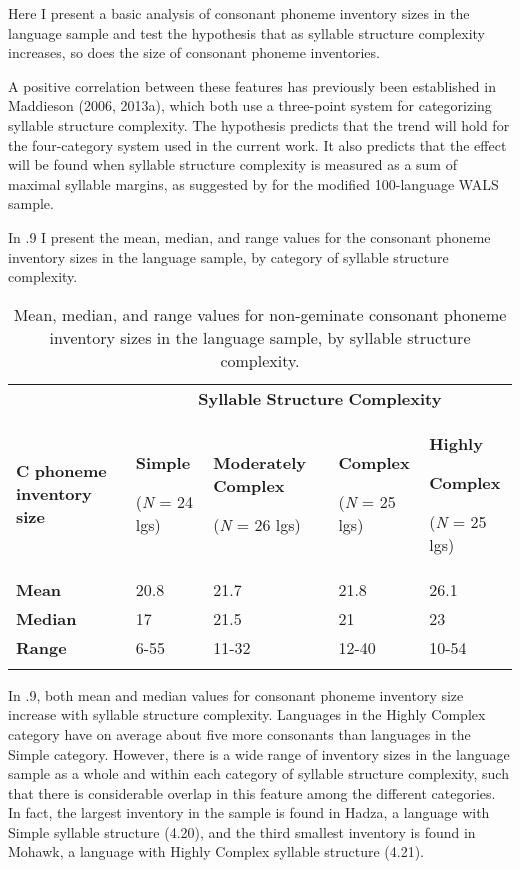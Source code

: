  Here I present a basic analysis of consonant phoneme inventory sizes in the language sample and test the hypothesis that as syllable structure complexity increases, so does the size of consonant phoneme inventories.

  A positive correlation between these features has previously been established in Maddieson (2006, 2013a), which both use a three-point system for categorizing syllable structure complexity. The hypothesis predicts that the trend will hold for the four-category system used in the current work. It also predicts that the effect will be found when syllable structure complexity is measured as a sum of maximal syllable margins, as suggested by \citet{Gordon2016} for the modified 100-language WALS sample.

  In .9 I present the mean, median, and range values for the consonant phoneme inventory sizes in the language sample, by category of syllable structure complexity. 

\begin{table}
\begin{tabularx}{\textwidth}{XXXXX}
 & \multicolumn{4}{c}{ \textbf{Syllable} \textbf{Structure} \textbf{Complexity}}\\
\lsptoprule
\textbf{C} \textbf{phoneme} \textbf{inventory} \textbf{size} & { \textbf{Simple}}

 (\textit{N} = 24 lgs) & { \textbf{Moderately} \textbf{Complex}}

 (\textit{N} = 26 lgs) & { \textbf{Complex}}

 (\textit{N} = 25 lgs) & { \textbf{Highly} }

{ \textbf{Complex}}

 (\textit{N} = 25 lgs)\\
\textbf{Mean} & 20.8 & 21.7 & 21.8 & 26.1\\
\textbf{Median} & 17 & 21.5 & 21 & 23\\
\textbf{Range} & 6-55 & 11-32 & 12-40 & 10-54\\
\lspbottomrule
\end{tabularx}
\caption{\label{4.9}Mean, median, and range values for non-geminate consonant phoneme inventory sizes in the language sample, by syllable structure complexity.}
\end{table}

  In .9, both mean and median values for consonant phoneme inventory size increase with syllable structure complexity. Languages in the Highly Complex category have on average about five more consonants than languages in the Simple category. However, there is a wide range of inventory sizes in the language sample as a whole and within each category of syllable structure complexity, such that there is considerable overlap in this feature among the different categories. In fact, the largest inventory in the sample is found in Hadza, a language with Simple syllable structure (4.20), and the third smallest inventory is found in Mohawk, a language with Highly Complex syllable structure (4.21).

